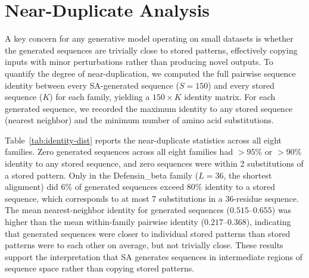 \section{Near-Duplicate Analysis}\label{si:identity-distribution}

A key concern for any generative model operating on small datasets is whether the generated sequences are trivially close to stored patterns, effectively copying inputs with minor perturbations rather than producing novel outputs. To quantify the degree of near-duplication, we computed the full pairwise sequence identity between every SA-generated sequence ($S{=}150$) and every stored sequence ($K$) for each family, yielding a $150 \times K$ identity matrix. For each generated sequence, we recorded the maximum identity to any stored sequence (nearest neighbor) and the minimum number of amino acid substitutions.

Table~\ref{tab:identity-dist} reports the near-duplicate statistics across all eight families. Zero generated sequences across all eight families had $>95\%$ or $>90\%$ identity to any stored sequence, and zero sequences were within 2 substitutions of a stored pattern. Only in the Defensin\_beta family ($L{=}36$, the shortest alignment) did $6\%$ of generated sequences exceed $80\%$ identity to a stored sequence, which corresponds to at most 7 substitutions in a 36-residue sequence. The mean nearest-neighbor identity for generated sequences ($0.515$--$0.655$) was higher than the mean within-family pairwise identity ($0.217$--$0.368$), indicating that generated sequences were closer to individual stored patterns than stored patterns were to each other on average, but not trivially close. These results support the interpretation that SA generates sequences in intermediate regions of sequence space rather than copying stored patterns.


